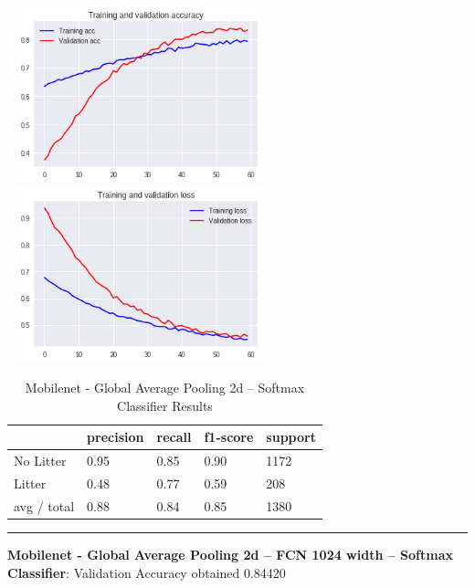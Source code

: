\documentclass{IEEEtran}
\begin{document}
 \includegraphics[width=3in,height=2in]{mobilenet-img/mobilenet-img003.png} 
\includegraphics[width=3in,height=2in]{mobilenet-img/mobilenet-img004.png} 


\bigskip


\begin{table}[ht]
\centering
\caption{Mobilenet - Global Average Pooling 2d -- Softmax Classifier Results}
\begin{tabular}{|l|l|l|l|l|} 
\hline
 & precision & recall  & f1-score  & support \\\hline
No Litter &
0.95 &
0.85 &
0.90 &
1172 \\\hline
Litter &
0.48 &
0.77 &
0.59 &
208 \\\hline
avg / total &
0.88 &
0.84 &
0.85 &
1380\\\hline
\end{tabular}
\end{table}

\begin{center}\noindent\rule{8cm}{0.4pt}\end{center}

\textbf{Mobilenet - Global Average Pooling 2d -- FCN 1024 width -- Softmax Classifier}: Validation Accuracy obtained 0.84420
\end{document}
